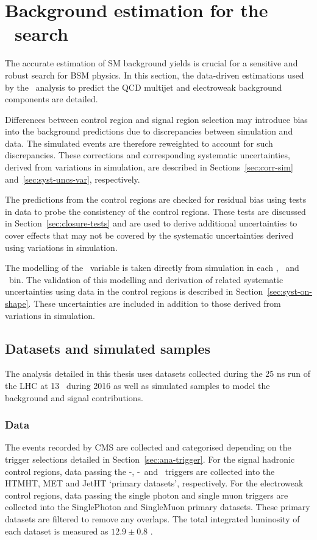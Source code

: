 \chapter{Background estimation for the \alphat~search}
\label{cha:backgroundPrediction}

The accurate estimation of SM background yields is crucial for a sensitive and robust
search for BSM physics. In this section, the data-driven estimations used by
the \alphat~analysis to predict the QCD multijet and electroweak 
background components are detailed. 

Differences between control region and signal 
region selection may introduce bias into the background predictions
due to discrepancies between simulation and data. 
The simulated events are therefore reweighted to account for such discrepancies.
These corrections and corresponding systematic uncertainties, derived
from variations in simulation, are described in Sections~\ref{sec:corr-sim} 
and~\ref{sec:syst-uncs-var}, respectively.  

The predictions from the control regions are checked for residual bias 
using tests in data to probe the consistency of the control regions. 
These tests are discussed in Section~\ref{sec:closure-tests} and 
are used to derive additional uncertainties to cover effects 
that may not be covered by the systematic uncertainties derived 
using variations in simulation.

The modelling of the \mht~variable is taken directly from simulation in each \nj, \nb~and \scalht~bin. The validation of this modelling 
and derivation of related systematic uncertainties using data in the 
control regions is described in Section~\ref{sec:syst-on-shape}. These uncertainties 
are included in addition to those derived from variations in simulation.

\section{Datasets and simulated samples}

The analysis detailed in this thesis uses datasets collected during the 25 ns run of the 
LHC at 13 \TeV~during 2016 as well as simulated samples to model the background and
signal contributions.

\subsection{Data}
The events recorded by CMS are collected and categorised depending on the trigger selections
detailed in Section~\ref{sec:ana-trigger}. For the signal hadronic control regions, data passing the \alphat-\scalht,
\mht-\met~and \scalht~triggers are collected into the HTMHT, MET and JetHT `primary datasets', respectively.
For the electroweak control regions, data passing the single photon and single muon triggers are collected 
into the SinglePhoton and SingleMuon primary datasets. These primary datasets are filtered to remove
any overlaps. The total integrated luminosity of each dataset is measured as $12.9\pm0.8$ \ifb.

